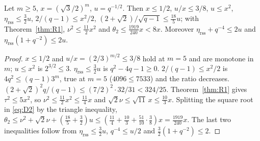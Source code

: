 \begin{lemma}[arithmetic]\label{lem:app-arith}
Let $m\ge5$, $x=(\sqrt3/2)^m$, $u=q^{-1/2}$. Then $x\le1/2$, $u/x\le3/8$, $u\le x^2$, $\eta_{\mathrm{rss}}\le\frac32u$, $2/(q-1)\le x^2/2$,
$(2+\sqrt2)/\sqrt{q-1}\le\frac{18}5u$; with Theorem~\ref{thm:R1}, $\nu^2\le\frac{11}2x^2$ and $\theta_2\le\frac{1919}{240}x<8x$. Moreover
$\eta_{\mathrm{rss}}+q^{-4}\le2u$ and $\eta_{\mathrm{rss}}(1+q^{-2})\le2u$.
\end{lemma}
\begin{proof}
$x\le1/2$ and $u/x=(2/3)^{m/2}\le3/8$ hold at $m=5$ and are monotone in $m$; $u\le x^2$ is $2^{3/2}\le3$. $\eta_{\mathrm{rss}}\le\frac32u$ is $q^2-4q-1\ge0$.
$2/(q-1)\le x^2/2$ is $4q^2\le(q-1)3^m$, true at $m=5$ ($4096\le7533$) and the ratio decreases. $(2+\sqrt2)^2q/(q-1)\le(7/2)^2\cdot32/31<324/25$.
Theorem~\ref{thm:R1} gives $\tau^2\le5x^2$, so $\nu^2\le\frac{11}2x^2\le\frac{11}4x$ and $\sqrt2\nu\le\sqrt{11}\,x\le\frac{10}3x$. Splitting the square root in
\eqref{eq:D2} by the triangle inequality, $\theta_2\le\nu^2+\sqrt2\nu+(\frac{18}5+\frac32)u\le(\frac{11}4+\frac{10}3+\frac{51}{10}\cdot\frac38)x=\frac{1919}{240}x$. The last two
inequalities follow from $\eta_{\mathrm{rss}}\le\frac32u$, $q^{-4}\le u/2$ and $\frac32(1+q^{-2})\le2$.
\end{proof}
